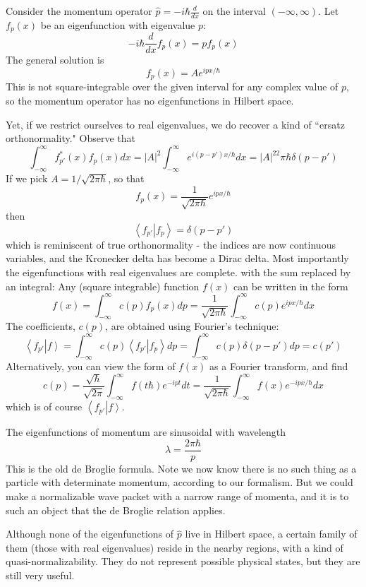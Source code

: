 \documentclass[12pt, a4paper, oneside, openright, titlepage]{book}
\newcommand{\braket}[2]{\left\langle#1\right\vert\left.#2\right\rangle}
\begin{document}
\begin{eg}
    Consider the momentum operator $\hat{p} = -i\hbar\frac{d}{dx}$ on the interval $(-\infty,\infty)$. Let $f_p(x)$ be an eigenfunction with eigenvalue $p$: $$-i\hbar\frac{d}{dx}f_p(x) = pf_p(x)$$
    The general solution is $$f_p(x) = Ae^{ipx/\hbar}$$ This is not square-integrable over the given interval for any complex value of $p$, so the momentum operator has no eigenfunctions in Hilbert space.

    Yet, if we restrict ourselves to real eigenvalues, we do recover a kind of ``ersatz orthonormality." Observe that $$\int_{-\infty}^{\infty}f_{p'}^*(x)f_p(x)dx = |A|^2\int_{-\infty}^{\infty}e^{i(p-p')x/\hbar}dx = |A|^22\pi\hbar\delta(p-p')$$
    If we pick $A = 1/\sqrt{2\pi \hbar}$, so that $$f_p(x) = \frac{1}{\sqrt{2\pi \hbar}}e^{ipx/\hbar}$$ then $$\braket{f_{p'}}{f_p} = \delta(p-p')$$
    which is reminiscent of true orthonormality - the indices are now continuous variables, and the Kronecker delta has become a Dirac delta. Most importantly the eigenfunctions with real eigenvalues are complete. with the sum replaced by an integral: Any (square integrable) function $f(x)$ can be written in the form \begin{equation*}
        f(x) = \int_{-\infty}^{\infty}c(p)f_p(x)dp = \frac{1}{\sqrt{2\pi\hbar}}\int_{-\infty}^{\infty}c(p)e^{ipx/\hbar}dx
    \end{equation*}
    The coefficients, $c(p)$, are obtained using Fourier's technique: \begin{equation*}
        \braket{f_{p'}}{f} = \int_{-\infty}^{\infty}c(p)\braket{f_{p'}}{f_p}dp = \int_{-\infty}^{\infty}c(p)\delta(p-p')dp = c(p')
    \end{equation*}
    Alternatively, you can view the form of $f(x)$ as a Fourier transform, and find $$c(p) = \frac{\sqrt{\hbar}}{\sqrt{2\pi}}\int_{-\infty}^{\infty}f(t\hbar)e^{-ipt}dt = \frac{1}{\sqrt{2\pi\hbar}}\int_{-\infty}^{\infty}f(x)e^{-ipx/\hbar}dx$$
    which is of course $\braket{f_{p'}}{f}$.
\end{eg}

The eigenfunctions of momentum are sinusoidal with wavelength $$\lambda = \frac{2\pi \hbar}{p}$$ This is the old de Broglie formula. Note we now know there is no such thing as a particle with determinate momentum, according to our formalism. But we could make a normalizable wave packet with a narrow range of momenta, and it is to such an object that the de Broglie relation applies.

Although none of the eigenfunctions of $\hat{p}$ live in Hilbert space, a certain family of them (those with real eigenvalues) reside in the nearby regions, with a kind of quasi-normalizability. They do not represent possible physical states, but they are still very useful.
\end{document}
